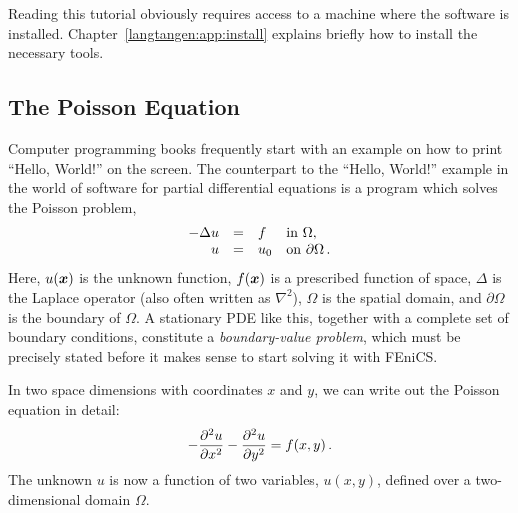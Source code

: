 
Reading this tutorial obviously requires access to a machine where the
\fenics{} software
is installed. Chapter~\ref{langtangen:app:install} explains briefly how
to install the necessary tools.

\subsection{The Poisson Equation}
\label{langtangen:poisson1:bvp}

Computer programming books frequently start with an example on how to print
``Hello, World!'' on the screen. The counterpart to the ``Hello, World!''
example in the world of software for partial differential equations
is a program which solves the Poisson problem,
\begin{equation} \label{langtangen:poisson1}
  \begin{array}{rcll}
    - \Delta u &=& f &\mbox{in } \Omega, \\
    u &=& u_0 &\mbox{on } \partial \Omega\thinspace .
  \end{array}
\end{equation}
Here, $u({\mbox{\boldmath $x$}})$ is the unknown function, $f({\mbox{\boldmath $x$}})$ is a prescribed function
of space, $\Delta$  is the Laplace operator (also often written
as $\nabla^2$), $\Omega$ is the spatial domain, and $\partial\Omega$ is
the boundary of $\Omega$. A stationary PDE like this, together with a
complete set of boundary conditions, constitute a
\emph{boundary-value problem}, which must be precisely stated before
it makes sense to start solving it with FEniCS.

In two space dimensions
with coordinates $x$ and $y$, we can write out the Poisson equation
in detail:
\begin{equation}
- {\partial^2 u\over\partial x^2} -
{\partial^2 u\over\partial y^2} = f(x,y)\thinspace .
\end{equation}
The unknown $u$ is now a function of two variables, $u(x,y)$, defined
over a two-dimensional domain $\Omega$.

